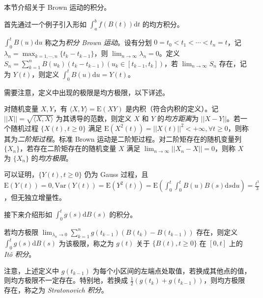 \documentclass[../main.tex]{subfiles}
\begin{document}
本节介绍关于 Brown 运动的积分。

首先通过一个例子引入形如 $\int_a^bf(B(t))\mathrm dt$ 的均方积分。

\begin{example}
    $\int_0^tB(u)\mathrm du$ 称之为\emph{积分 Brown 运动}。设有分划 $0=t_0<t_1<\cdots<t_n=t$，记 $\lambda_n=\max_{k=1,\cdots,n}\{t_k-t_{k-1}\}$，则 $\lim_{n\rightarrow\infty}\lambda_n=0$。定义 $S_n=\sum_{k=1}^nB(u_k)(t_k-t_{k-1})(u_k\in[t_{k-1},t_k])$，若 $\lim_{n\rightarrow\infty}S_n$ 存在，记为 $Y(t)$，则定义 $\int_0^tB(u)\mathrm du=Y(t)$。
\end{example}

需要注意，定义中出现的极限是均方极限，以下详述。

\begin{definition}\label{def:8.5.1}
    对随机变量 $X,Y$，有 $\langle X,Y\rangle=\mathrm E(XY)$ 是内积（符合内积的定义）。记 $||X||=\sqrt{\langle X,X\rangle}$ 为其诱导的范数，则定义 $X$ 和 $Y$ 的\emph{均方距离}为 $||X-Y||$。若一个随机过程 $\{X(t),t\geq0\}$ 满足 $\mathrm E(X^2(t))=||X(t)||^2<+\infty,\forall t\geq0$，则称其为\emph{二阶矩过程}。标准 Brown 运动是二阶矩过程。对二阶矩存在的随机变量列 $\{X_n\}$，若存在二阶矩存在的随机变量 $X$ 满足 $\lim_{n\rightarrow\infty}||X_n-X||=0$，则称 $X$ 为 $\{X_n\}$ 的\emph{均方极限}。
\end{definition}

可以证明，$\{Y(t),t\geq0\}$ 仍为 Gauss 过程，且 $\mathrm E(Y(t))=0,\mathrm{Var}(Y(t))=\mathrm E(Y^2(t))=\mathrm E(\int_0^t\int_0^tB(u)B(s)\mathrm ds\mathrm du)=\frac{t^3}3$，但无独立增量性。

接下来介绍形如 $\int_0^tg(s)\mathrm dB(s)$ 的积分。

\begin{definition}\label{def:8.5.2}
    若均方极限 $\lim_{\lambda_n\rightarrow0}\sum_{k=1}^ng(t_{k-1})(B(t_k)-B(t_{k-1}))$ 存在，则定义 $\int_0^tg(s)\mathrm dB(s)$ 为该极限，称之为 $g(t)$ 关于 $\{B(t),t\geq0\}$ 在 $[0,t]$ 上的 \emph{It\^o 积分}。
\end{definition}

注意，上述定义中 $g(t_{k-1})$ 为每个小区间的左端点处取值，若换成其他点的值，则均方极限不一定存在。特别地，若换成 $\frac12(g(t_k)+g(t_{k-1}))$，则均方极限存在，称之为 \emph{Stratonovich 积分}。
\end{document}

